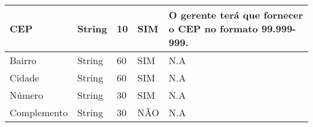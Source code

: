 \begin{enumerate}[label=RN\arabic*]
\begin{table}[htb]
\begin{tabular}{|p{3.0cm}|p{2.0cm}|p{1.5cm}|p{2.0cm}|p{5.75cm}|}
			CEP            & String        & 10               & SIM                  & O gerente terá que fornecer o CEP no formato \textbf{99.999-999}.                    \\ \hline
			Bairro         & String        & 60               & SIM                  & N.A                                                                                  \\ \hline
			Cidade         & String        & 60               & SIM                  & N.A                                                                                  \\ \hline
			Número         & String        & 30               & SIM                  & N.A                                                                                  \\ \hline
			Complemento    & String        & 30               & NÃO                  & N.A                                                                                  \\ \hline
		\end{tabular}
	\end{table}
\end{enumerate}